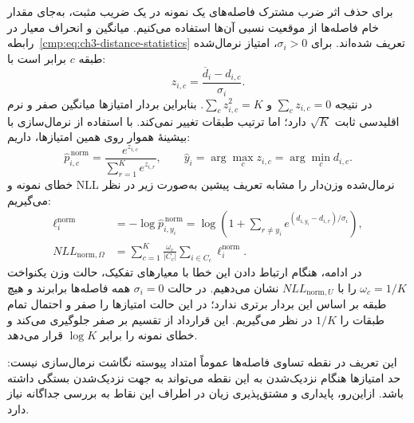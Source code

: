 برای حذف اثر ضرب مشترک فاصله‌های یک نمونه
در یک ضریب مثبت، به‌جای مقدار خام فاصله‌ها
از موقعیت نسبی آن‌ها استفاده می‌کنیم.
میانگین و انحراف معیار در
رابطه~\eqref{cmp:eq:ch3-distance-statistics}
تعریف شده‌اند.
برای $\sigma_i>0$، امتیاز نرمال‌شده طبقه $c$ برابر است با:
\begin{equation}\label{cmp:eq:ch3-normalized-score}
\boxed{z_{i,c}=\frac{\overline d_i-d_{i,c}}{\sigma_i}.}
\end{equation}
در نتیجه $\sum_cz_{i,c}=0$ و $\sum_cz_{i,c}^2=K$. بنابراین بردار امتیازها میانگین صفر و نرم اقلیدسی ثابت $\sqrt K$ دارد؛ اما ترتیب طبقات تغییر نمی‌کند. با استفاده از نرمال‌سازی با بیشینهٔ هموار روی همین امتیازها، داریم:
\begin{equation}\label{cmp:eq:ch3-normalized-softmax}
\widehat p_{i,c}^{\,\mathrm{norm}}
=\frac{e^{z_{i,c}}}{\sum_{r=1}^{K}e^{z_{i,r}}},
\qquad
\widehat y_i=\arg\max_c z_{i,c}=\arg\min_c d_{i,c}.
\end{equation}
خطای نمونه و NLL نرمال‌شده وزن‌دار را مشابه تعریف پیشین به‌صورت زیر در نظر می‌گیریم:
\begin{equation}\label{cmp:eq:ch3-normalized-NLL}
\boxed{
\begin{aligned}
\ell_i^{\mathrm{norm}}
&=-\log\widehat p_{i,y_i}^{\,\mathrm{norm}}
=\log\left(1+\sum_{r\ne y_i}
e^{(d_{i,y_i}-d_{i,r})/\sigma_i}\right),\\
NLL_{\mathrm{norm},\Omega}
&=\sum_{c=1}^{K}\frac{\omega_c}{|C_c|}
\sum_{i\in C_c}\ell_i^{\mathrm{norm}}.
\end{aligned}}
\end{equation}
در ادامه، هنگام ارتباط دادن این خطا با معیارهای تفکیک، حالت وزن یکنواخت $\omega_c=1/K$ را با $NLL_{\mathrm{norm},U}$ نشان می‌دهیم.
در حالت $\sigma_i=0$ همه فاصله‌ها برابرند و هیچ طبقه بر اساس این بردار برتری ندارد؛ در این حالت امتیازها را صفر و احتمال تمام طبقات را $1/K$ در نظر می‌گیریم. این قرارداد از تقسیم بر صفر جلوگیری می‌کند و خطای نمونه را برابر $\log K$ قرار می‌دهد.

این تعریف در نقطه تساوی فاصله‌ها عموماً
امتداد پیوسته نگاشت نرمال‌سازی نیست:
حد امتیازها هنگام نزدیک‌شدن به این نقطه
می‌تواند به جهت نزدیک‌شدن بستگی داشته باشد.
ازاین‌رو، پایداری و مشتق‌پذیری زیان
در اطراف این نقاط به بررسی جداگانه نیاز دارد.

